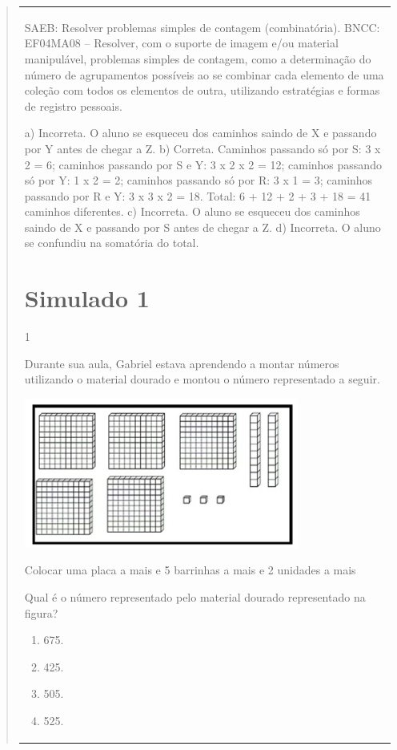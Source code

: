 \begin{mdframed}[linewidth=2pt,linecolor=salmao,roundcorner=2pt]
\begin{itemize}
{\begin{itemize}
\begin{escolha}
{\begin{quote}
{\begin{escolha}
{{{{{\begin{longtable}[]{@{}l@{}}
\begin{itemize}
{SAEB: Resolver problemas simples de contagem (combinatória).
BNCC: EF04MA08 -- Resolver, com o suporte de imagem e/ou material manipulável, problemas simples
de contagem, como a determinação do número de agrupamentos possíveis ao se combinar cada
elemento de uma coleção com todos os elementos de outra, utilizando estratégias e formas de
registro pessoais.

a) Incorreta. O aluno se esqueceu dos caminhos saindo de X e passando por Y antes de chegar a Z.
b) Correta. Caminhos passando só por S: 3 x 2 = 6; caminhos passando por S e Y: 3 x 2 x 2 = 12; caminhos passando só por Y: 1 x 2 = 2; caminhos passando só por R: 3 x 1 = 3; caminhos passando por R e Y: 3 x 3 x 2 = 18. Total: 6 + 12 + 2 + 3 + 18 = 41 caminhos diferentes.
c) Incorreta. O aluno se esqueceu dos caminhos saindo de X e passando por S antes de chegar a Z.
d) Incorreta. O aluno se confundiu na somatória do total.

\chapter{Simulado 1}
\markboth{Simulado 1}{}

\num{1}

Durante sua aula, Gabriel estava aprendendo a montar números utilizando o
material dourado e montou o número representado a seguir.

\includegraphics[width=3.55128in,height=1.93600in]{media/image142.png}

Colocar uma placa a mais e 5 barrinhas a mais e 2 unidades a mais

Qual é o número representado pelo material dourado representado na figura?

\begin{enumerate}
\item
  675.
\item
  425.
\item
  505.
\item
  525.
\end{enumerate}

}
\end{itemize}
\end{longtable}}}}}}
\end{escolha}}
\end{quote}}
\end{escolha}
\end{itemize}}
\end{itemize}
\end{mdframed}
